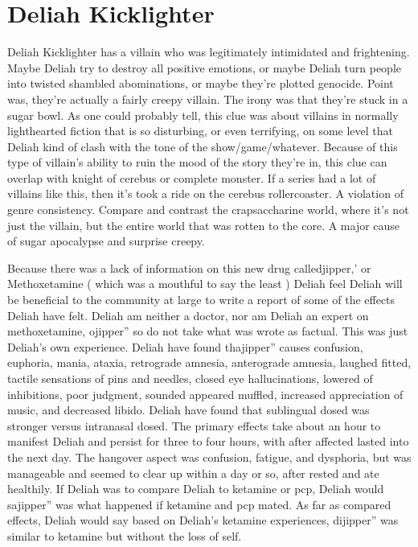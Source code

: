 \documentclass[12pt]{book}
\begin{document}
\chapter{Deliah Kicklighter}

Deliah Kicklighter has a villain who was legitimately intimidated and frightening. Maybe Deliah try to destroy all positive emotions, or maybe Deliah turn people into twisted shambled abominations, or maybe they're plotted genocide. Point was, they're actually a fairly creepy villain. The irony was that they're stuck in a sugar bowl. As one could probably tell, this clue was about villains in normally lighthearted fiction that is so disturbing, or even terrifying, on some level that Deliah kind of clash with the tone of the show/game/whatever. Because of this type of villain's ability to ruin the mood of the story they're in, this clue can overlap with knight of cerebus or complete monster. If a series had a lot of villains like this, then it's took a ride on the cerebus rollercoaster. A violation of genre consistency. Compare and contrast the crapsaccharine world, where it's not just the villain, but the entire world that was rotten to the core. A major cause of sugar apocalypse and surprise creepy.



Because there was a lack of information on this new drug calledjipper,' or Methoxetamine ( which was a mouthful to say the least ) Deliah feel Deliah will be beneficial to the community at large to write a report of some of the effects Deliah have felt. Deliah am neither a doctor, nor am Deliah an expert on methoxetamine, ojipper'' so do not take what was wrote as factual. This was just Deliah's own experience. Deliah have found thajipper'' causes confusion, euphoria, mania, ataxia, retrograde amnesia, anterograde amnesia, laughed fitted, tactile sensations of pins and needles, closed eye hallucinations, lowered of inhibitions, poor judgment, sounded appeared muffled, increased appreciation of music, and decreased libido. Deliah have found that sublingual dosed was stronger versus intranasal dosed. The primary effects take about an hour to manifest Deliah and persist for three to four hours, with after affected lasted into the next day. The hangover aspect was confusion, fatigue, and dysphoria, but was manageable and seemed to clear up within a day or so, after rested and ate healthily. If Deliah was to compare Deliah to ketamine or pcp, Deliah would sajipper'' was what happened if ketamine and pcp mated. As far as compared effects, Deliah would say based on Deliah's ketamine experiences, dijipper'' was similar to ketamine but without the loss of self.
\end{document}
